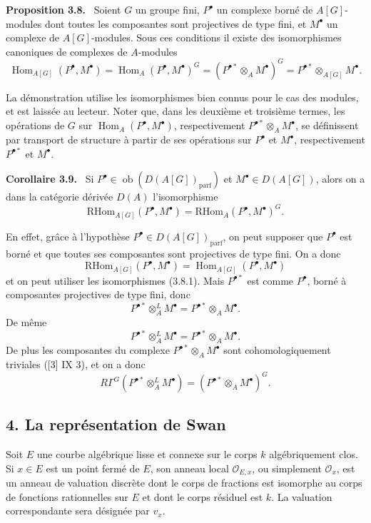 \documentclass[11pt]{article}
\newenvironment{statement}[1]{\par\medskip\noindent\textbf{#1.}\ }{\par\medskip}
\DeclareMathOperator{\Hom}{Hom}
\providecommand{\RHom}{\mathrm{RHom}}
\providecommand{\parf}{\mathrm{parf}}
\providecommand{\Ob}{\operatorname{ob}}
\providecommand{\RHom}{\mathrm{RHom}}
\providecommand{\Hom}{\operatorname{Hom}}
\providecommand{\RHom}{\mathrm R\mathcal{H}om}
\providecommand{\Ob}{\operatorname{ob}}
\providecommand{\Ob}{\operatorname{Ob}}
\providecommand{\parf}{\mathrm{parf}}
\begin{document}
\begin{statement}{Proposition 3.8}
Soient $G$ un groupe fini, $P^\bullet$ un complexe borné de $A[G]$-modules dont toutes les composantes sont projectives de type fini, et $M^\bullet$ un complexe de $A[G]$-modules. Sous ces conditions il existe des isomorphismes canoniques de complexes de $A$-modules
\[
\Hom_{A[G]}(P^\bullet,M^\bullet)=\Hom_A(P^\bullet,M^\bullet)^G=(P^{\bullet *}\otimes_A M^\bullet)^G=P^{\bullet *}\otimes_{A[G]}M^\bullet.
\tag{3.8.1}
\]
\end{statement}

La démonstration utilise les isomorphismes bien connus pour le cas des modules, et est laissée au lecteur. Noter que, dans les deuxième et troisième termes, les opérations de $G$ sur $\Hom_A(P^\bullet,M^\bullet)$, respectivement $P^{\bullet *}\otimes_A M^\bullet$, se définissent par transport de structure à partir de ses opérations sur $P^\bullet$ et $M^\bullet$, respectivement $P^{\bullet *}$ et $M^\bullet$.

\begin{statement}{Corollaire 3.9}
Si $P^\bullet\in\Ob(D(A[G])_{\parf})$ et $M^\bullet\in D(A[G])$, alors on a dans la catégorie dérivée $D(A)$ l'isomorphisme
\[
\RHom_{A[G]}(P^\bullet,M^\bullet)=\RHom_A(P^\bullet,M^\bullet)^G.
\tag{3.9.1}
\]
\end{statement}

En effet, grâce à l'hypothèse $P^\bullet\in D(A[G])_{\parf}$, on peut supposer que $P^\bullet$ est borné et que toutes ses composantes sont projectives de type fini. On a donc
\[
\RHom_{A[G]}(P^\bullet,M^\bullet)=\Hom_{A[G]}(P^\bullet,M^\bullet)
\]
et on peut utiliser les isomorphismes (3.8.1). Mais $P^{\bullet *}$ est comme $P^\bullet$, borné à composantes projectives de type fini, donc
\[
P^{\bullet *}\otimes_A^L M^\bullet=P^{\bullet *}\otimes_A M^\bullet.
\]
De même
\[
P^{\bullet *}\otimes_A^L M^\bullet=P^{\bullet *}\otimes_A M^\bullet.
\]
De plus les composantes du complexe $P^{\bullet *}\otimes_A M^\bullet$ sont cohomologiquement triviales ([3] IX 3), et on a donc
\[
R\Gamma^G(P^{\bullet *}\otimes_A^L M^\bullet)=(P^{\bullet *}\otimes_A M^\bullet)^G.
\]

\subsection*{4. La représentation de Swan}

Soit $E$ une courbe algébrique lisse et connexe sur le corps $k$ algébriquement clos. Si $x\in E$ est un point fermé de $E$, son anneau local $\mathcal O_{E,x}$, ou simplement $\mathcal O_x$, est un anneau de valuation discrète dont le corps de fractions est isomorphe au corps de fonctions rationnelles sur $E$ et dont le corps résiduel est $k$. La valuation correspondante sera désignée par $v_x$.
\end{document}
